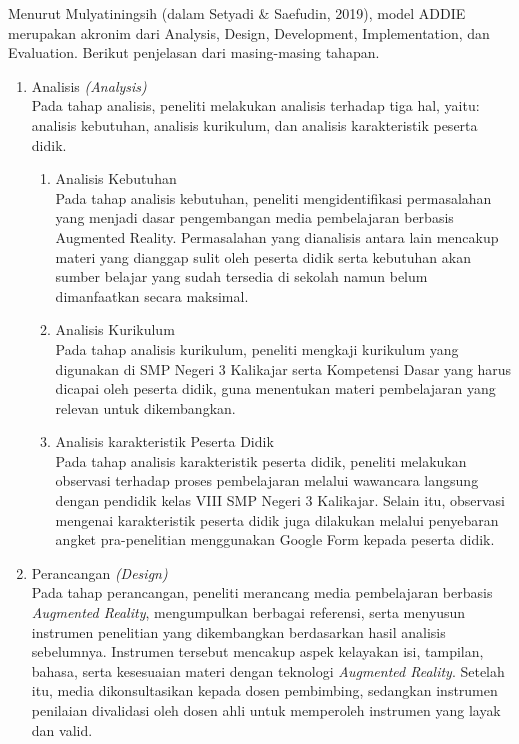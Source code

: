 \documentclass[12pt]{article}
\begin{document}
\hspace*{1cm}Menurut Mulyatiningsih (dalam Setyadi \& Saefudin, 2019), model ADDIE merupakan akronim dari Analysis, Design, Development, Implementation, dan Evaluation. Berikut penjelasan dari masing-masing tahapan.
\begin{enumerate}
    \item Analisis \textit{(Analysis)}\\
    \hspace*{1cm}Pada tahap analisis, peneliti melakukan analisis terhadap tiga hal, yaitu: analisis kebutuhan, analisis kurikulum, dan analisis karakteristik peserta didik.
    \begin{enumerate}
        \item Analisis Kebutuhan\\
        \hspace*{1cm}Pada tahap analisis kebutuhan, peneliti mengidentifikasi permasalahan yang menjadi dasar pengembangan media pembelajaran berbasis Augmented Reality. Permasalahan yang dianalisis antara lain mencakup materi yang dianggap sulit oleh peserta didik serta kebutuhan akan sumber belajar yang sudah tersedia di sekolah namun belum dimanfaatkan secara maksimal.
        \item Analisis Kurikulum\\
        \hspace*{1cm}Pada tahap analisis kurikulum, peneliti mengkaji kurikulum yang digunakan di SMP Negeri 3 Kalikajar serta Kompetensi Dasar yang harus dicapai oleh peserta didik, guna menentukan materi pembelajaran yang relevan untuk dikembangkan.
        \item Analisis karakteristik Peserta Didik\\
        \hspace*{1cm}Pada tahap analisis karakteristik peserta didik, peneliti melakukan observasi terhadap proses pembelajaran melalui wawancara langsung dengan pendidik kelas VIII SMP Negeri 3 Kalikajar. Selain itu, observasi mengenai karakteristik peserta didik juga dilakukan melalui penyebaran angket pra-penelitian menggunakan Google Form kepada peserta didik.
    \end{enumerate}
    \item Perancangan \textit{(Design)}\\
    \hspace*{1cm}Pada tahap perancangan, peneliti merancang media pembelajaran berbasis \textit{Augmented Reality}, mengumpulkan berbagai referensi, serta menyusun instrumen penelitian yang dikembangkan berdasarkan hasil analisis sebelumnya. Instrumen tersebut mencakup aspek kelayakan isi, tampilan, bahasa, serta kesesuaian materi dengan teknologi \textit{Augmented Reality}. Setelah itu, media dikonsultasikan kepada dosen pembimbing, sedangkan instrumen penilaian divalidasi oleh dosen ahli untuk memperoleh instrumen yang layak dan valid.

\end{enumerate}
\end{document}
